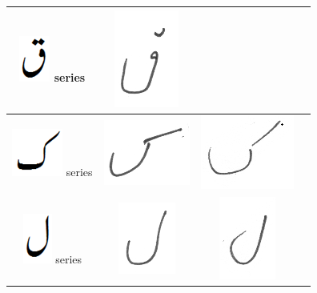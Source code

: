 \documentclass[a4paper,conference]{IEEEtran}
\begin{document}
\begin{table}[h]
\begin{tabular}{@{}cccc@{}}
\hline
\includegraphics[scale=0.20]{qaaf_orig} series & \includegraphics[scale=0.15]{202} & & \\
\hline
\includegraphics[scale=0.15]{kaaf_orig} series & \includegraphics[scale=0.15]{203} &
\includegraphics[scale=0.15]{204} & \\
\hline
\includegraphics[scale=0.15]{Laam_orig} series & \includegraphics[scale=0.15]{205} & \includegraphics[scale=0.15]{206} &  \\

\end{tabular}
\end{table}
\end{document}
